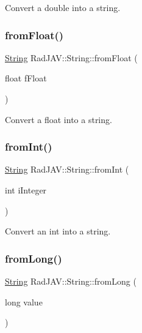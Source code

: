 Convert a double into a string. 

\mbox{\label{class_rad_j_a_v_1_1_string_a2dd011b85984bd4c4199b5fa07b24c6a}} 
\subsubsection{\texorpdfstring{from\+Float()}{fromFloat()}}
{\footnotesize\ttfamily \mbox{\hyperlink{class_rad_j_a_v_1_1_string}{String}} Rad\+J\+A\+V\+::\+String\+::from\+Float (\begin{DoxyParamCaption}\item[{float}]{f\+Float }\end{DoxyParamCaption})\hspace{0.3cm}{\ttfamily [static]}}



Convert a float into a string. 

\mbox{\label{class_rad_j_a_v_1_1_string_a6062497071348a2d203341c2f650085d}} 
\subsubsection{\texorpdfstring{from\+Int()}{fromInt()}}
{\footnotesize\ttfamily \mbox{\hyperlink{class_rad_j_a_v_1_1_string}{String}} Rad\+J\+A\+V\+::\+String\+::from\+Int (\begin{DoxyParamCaption}\item[{int}]{i\+Integer }\end{DoxyParamCaption})\hspace{0.3cm}{\ttfamily [static]}}



Convert an int into a string. 

\mbox{\label{class_rad_j_a_v_1_1_string_a037777a57b94a36a6f55cc88d5a1b647}} 
\subsubsection{\texorpdfstring{from\+Long()}{fromLong()}}
{\footnotesize\ttfamily \mbox{\hyperlink{class_rad_j_a_v_1_1_string}{String}} Rad\+J\+A\+V\+::\+String\+::from\+Long (\begin{DoxyParamCaption}\item[{long}]{value }\end{DoxyParamCaption})\hspace{0.3cm}{\ttfamily [static]}}



